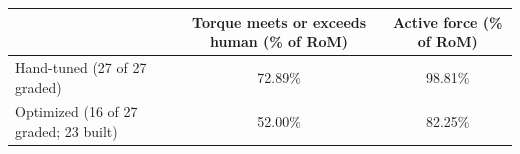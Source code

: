 \begin{tabular}{lcc}
\toprule
 & Torque meets or exceeds human (\% of RoM) & Active force (\% of RoM) \\
\midrule
Hand-tuned (27 of 27 graded) & 72.89\% & 98.81\% \\
Optimized (16 of 27 graded; 23 built) & 52.00\% & 82.25\% \\
\bottomrule
\end{tabular}
